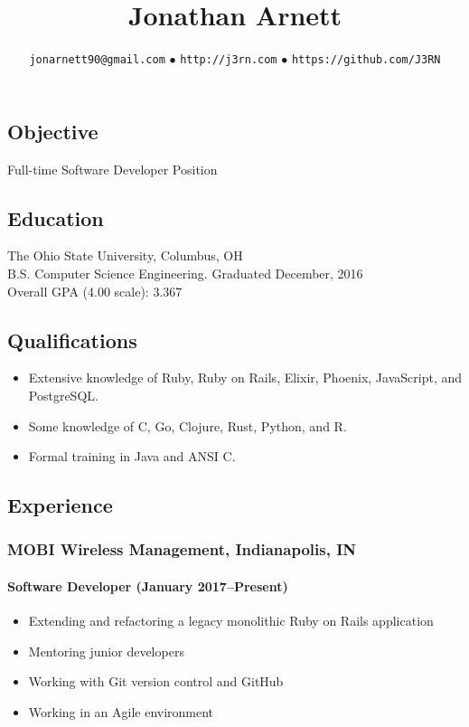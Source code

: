 \documentclass[]{article}
\begin{document}
\title{Jonathan Arnett}
\author{\texttt{jonarnett90@gmail.com} $\bullet$ \texttt{http://j3rn.com} $\bullet$ \texttt{https://github.com/J3RN}}
\date{}
\maketitle

\subsection*{Objective}
Full-time Software Developer Position

\subsection*{Education}
The Ohio State University, Columbus, OH \\
B.S. Computer Science Engineering. Graduated December, 2016 \\
Overall GPA (4.00 scale): 3.367

\subsection*{Qualifications}
\begin{itemize}
\item Extensive knowledge of Ruby, Ruby on Rails, Elixir, Phoenix, JavaScript, and PostgreSQL.
\item Some knowledge of C, Go, Clojure, Rust, Python, and R.
\item Formal training in Java and ANSI C.
\end{itemize}

\subsection*{Experience}

\subsubsection*{MOBI Wireless Management, Indianapolis, IN}
\paragraph*{Software Developer (January 2017--Present)}
\begin{itemize}
\item Extending and refactoring a legacy monolithic Ruby on Rails application
\item Mentoring junior developers
\item Working with Git version control and GitHub
\item Working in an Agile environment
\end{itemize}
\end{document}
